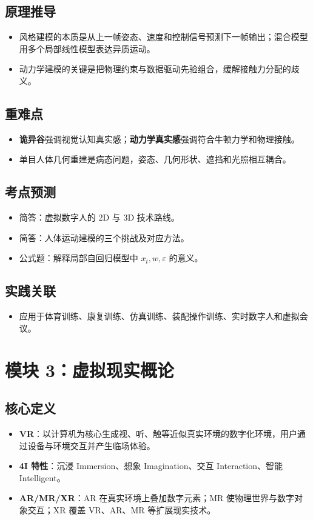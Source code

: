 \documentclass[UTF8,zihao=-4,scheme=chinese,fontset=fandol]{ctexart}
\newcommand{\key}[1]{\textbf{#1}}
\begin{document}
\subsection{原理推导}
\begin{itemize}
  \item 风格建模的本质是从上一帧姿态、速度和控制信号预测下一帧输出；混合模型用多个局部线性模型表达异质运动。
  \item 动力学建模的关键是把物理约束与数据驱动先验组合，缓解接触力分配的歧义。
\end{itemize}

\subsection{重难点}
\begin{itemize}
  \item \key{诡异谷}强调视觉认知真实感；\key{动力学真实感}强调符合牛顿力学和物理接触。
  \item 单目人体几何重建是病态问题，姿态、几何形状、遮挡和光照相互耦合。
\end{itemize}

\subsection{考点预测}
\begin{itemize}
  \item 简答：虚拟数字人的 2D 与 3D 技术路线。
  \item 简答：人体运动建模的三个挑战及对应方法。
  \item 公式题：解释局部自回归模型中 $x_t,w,\varepsilon$ 的意义。
\end{itemize}

\subsection{实践关联}
\begin{itemize}
  \item 应用于体育训练、康复训练、仿真训练、装配操作训练、实时数字人和虚拟会议。
\end{itemize}

\section{模块 3：虚拟现实概论}

\subsection{核心定义}
\begin{itemize}
  \item \key{VR}：以计算机为核心生成视、听、触等近似真实环境的数字化环境，用户通过设备与环境交互并产生临场体验。
  \item \key{4I 特性}：沉浸 Immersion、想象 Imagination、交互 Interaction、智能 Intelligent。
  \item \key{AR/MR/XR}：AR 在真实环境上叠加数字元素；MR 使物理世界与数字对象交互；XR 覆盖 VR、AR、MR 等扩展现实技术。
\end{itemize}
\end{document}

